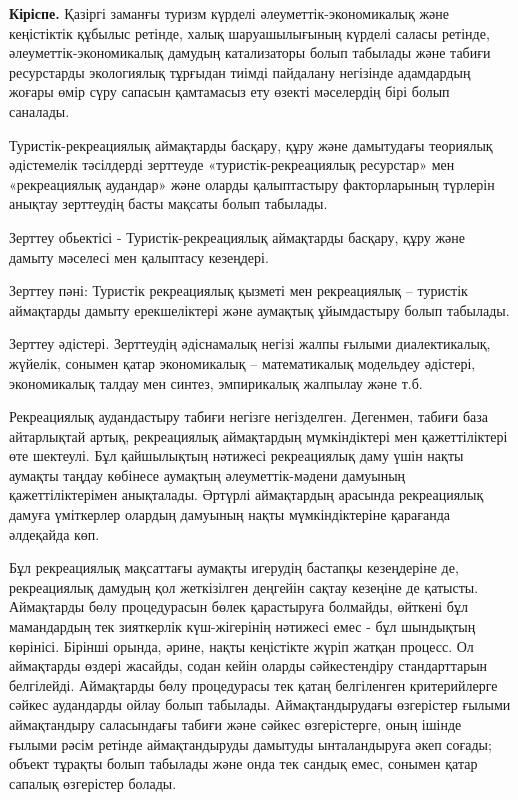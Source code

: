 \begin{multicols}{2}
{\bfseries Кіріспе.} Қазіргі заманғы туризм күрделі әлеуметтік-экономикалық
және кеңістіктік құбылыс ретінде, халық шаруашылығының күрделі саласы
ретінде, әлеуметтік-экономикалық дамудың катализаторы болып табылады
және табиғи ресурстарды экологиялық тұрғыдан тиімді пайдалану негізінде
адамдардың жоғары өмір сүру сапасын қамтамасыз ету өзекті мәселердің
бірі болып саналады.

Туристік-рекреациялық аймақтарды басқару, құру және дамытудағы теориялық
әдістемелік тәсілдерді зерттеуде «туристік-рекреациялық ресурстар» мен
«рекреациялық аудандар» және оларды қалыптастыру факторларының түрлерін
анықтау зерттеудің басты мақсаты болып табылады.

Зерттеу обьектісі - Туристік-рекреациялық аймақтарды басқару, құру және
дамыту мәселесі мен қалыптасу кезеңдері.

Зерттеу пәні: Туристік рекреациялық қызметі мен рекреациялық -- туристік
аймақтарды дамыту ерекшеліктері және аумақтық ұйымдастыру болып
табылады.

Зерттеу әдістері. Зерттеудің әдіснамалық негізі жалпы ғылыми
диалектикалық, жүйелік, сонымен қатар экономикалық -- математикалық
модельдеу әдістері, экономикалық талдау мен синтез, эмпирикалық жалпылау
және т.б.

Рекреациялық аудандастыру табиғи негізге негізделген. Дегенмен, табиғи
база айтарлықтай артық, рекреациялық аймақтардың мүмкіндіктері мен
қажеттіліктері өте шектеулі. Бұл қайшылықтың нәтижесі рекреациялық даму
үшін нақты аумақты таңдау көбінесе аумақтың әлеуметтік-мәдени дамуының
қажеттіліктерімен анықталады. Әртүрлі аймақтардың арасында рекреациялық
дамуға үміткерлер олардың дамуының нақты мүмкіндіктеріне қарағанда
әлдеқайда көп.

Бұл рекреациялық мақсаттағы аумақты игерудің бастапқы кезеңдеріне де,
рекреациялық дамудың қол жеткізілген деңгейін сақтау кезеңіне де
қатысты. Аймақтарды бөлу процедурасын бөлек қарастыруға болмайды,
өйткені бұл мамандардың тек зияткерлік күш-жігерінің нәтижесі емес - бұл
шындықтың көрінісі. Бірінші орында, әрине, нақты кеңістікте жүріп жатқан
процесс. Ол аймақтарды өздері жасайды, содан кейін оларды сәйкестендіру
стандарттарын белгілейді. Аймақтарды бөлу процедурасы тек қатаң
белгіленген критерийлерге сәйкес аудандарды ойлау болып табылады.
Аймақтандырудағы өзгерістер ғылыми аймақтандыру саласындағы табиғи және
сәйкес өзгерістерге, оның ішінде ғылыми рәсім ретінде аймақтандыруды
дамытуды ынталандыруға әкеп соғады; объект тұрақты болып табылады және
онда тек сандық емес, сонымен қатар сапалық өзгерістер болады.


\end{multicols}
